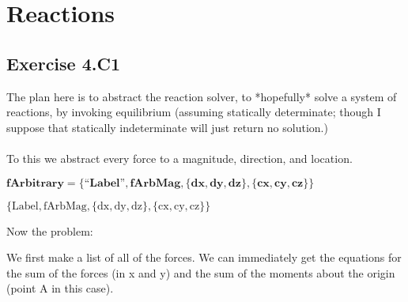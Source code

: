 \documentclass{article}
\begin{document}
\section*{Reactions}

\subsection*{Exercise 4.C1}

The plan here is to abstract the reaction solver, to *hopefully* solve a system of reactions, by invoking equilibrium (assuming statically determinate;
though I suppose that statically indeterminate will just return no solution.)\\
\\
To this we abstract every force to a magnitude, direction, and location.

\begin{doublespace}
\noindent\(\pmb{\text{fArbitrary}=\{\text{{``}Label{''}}, \text{fArbMag}, \{\text{dx}, \text{dy}, \text{dz}\}, \{\text{cx},\text{cy},\text{cz}\}\}}\)
\end{doublespace}

\begin{doublespace}
\noindent\(\{\text{Label},\text{fArbMag},\{\text{dx},\text{dy},\text{dz}\},\{\text{cx},\text{cy},\text{cz}\}\}\)
\end{doublespace}

Now the problem:

We first make a list of all of the forces. We can immediately get the equations for the sum of the forces (in x and y) and the sum of the moments
about the origin (point A in this case).
\end{document}
